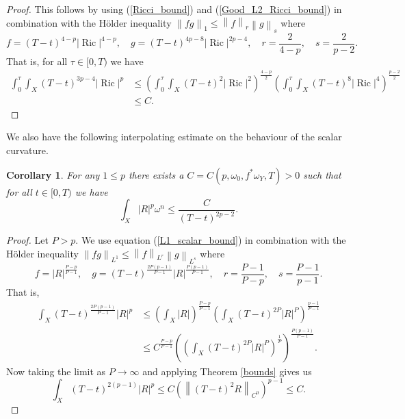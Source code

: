 \documentclass[12pt]{article}
\newtheorem{corollary}[theorem]{Corollary}
\numberwithin{equation}{section}
\DeclareMathOperator{\Ric}{Ric}
\newcommand{\norm}[1]{\left\|#1\right\|}
\begin{document}
\begin{proof}
This follows by using (\ref{Ricci_bound}) and (\ref{Good_L2_Ricci_bound}) in combination with the H\"older inequality $\norm{fg}_{1} \leq \norm{f}_{r} \norm{g}_{s}$ where
\begin{equation*}
    f = (T-t)^{4-p}|\Ric|^{4-p}, \quad g= (T-t)^{4p-8} |\Ric|^{2p-4}, \quad r = \frac{2}{4-p}, \quad s = \frac{2}{p-2}.
\end{equation*}
That is, for all $\tau \in [0,T)$ we have
\begin{align*}
    \int_0^\tau \int_X (T-t)^{3p-4}|\Ric|^p &\leq \left(\int_0^\tau \int_X (T-t)^2|\Ric|^2\right)^{\frac{4-p}{2}} \left(\int_0^\tau \int_X (T-t)^8 |\Ric|^4\right)^{\frac{p-2}{2}}\\
    &\leq C.
\end{align*}
\end{proof}

\noindent We also have the following interpolating estimate on the behaviour of the scalar curvature.

\begin{corollary}
For any $1 \leq p$ there exists a $C=C(p, \omega_0, f^*\omega_Y, T) > 0$ such that for all $t \in [0, T)$ we have
\begin{equation*}
    \int_X |R|^p \omega^n \leq \frac{C}{(T-t)^{2p-2}}.
\end{equation*}
\end{corollary}

\begin{proof}
Let $P > p$. We use equation (\ref{L1_scalar_bound}) in combination with the H\"older inequality $\norm{fg}_{L^1} \leq \norm{f}_{L^r} \norm{g}_{L^s}$ where
\begin{equation*}
    f = |R|^{\frac{P-p}{P-1}}, \quad g = (T-t)^{\frac{2P(p-1)}{P-1}} |R|^{\frac{P(p-1)}{P-1}}, \quad r = \frac{P-1}{P-p}, \quad s = \frac{P-1}{p-1}.
\end{equation*}
That is,
\begin{align*}
    \int_X (T-t)^{\frac{2P(p-1)}{P-1}} |R|^p &\leq \left(\int_X |R|\right)^{\frac{P-p}{P-1}} \left(\int_X (T-t)^{2P}|R|^{P}\right)^{\frac{p-1}{P-1}}\\
    &\leq C^{\frac{P-p}{P-1}} \left(\left(\int_X (T-t)^{2P}|R|^{P}\right)^{\frac{1}{P}}\right)^{\frac{P(p-1)}{P-1}}.
\end{align*}
Now taking the limit as $P \to \infty$ and applying Theorem \ref{bounds} gives us
\begin{equation*}
    \int_X (T-t)^{2(p-1)}|R|^p \leq C \left(\norm{(T-t)^2 R}_{C^0}\right)^{p-1} \leq C.
\end{equation*}
\end{proof}
\end{document}

